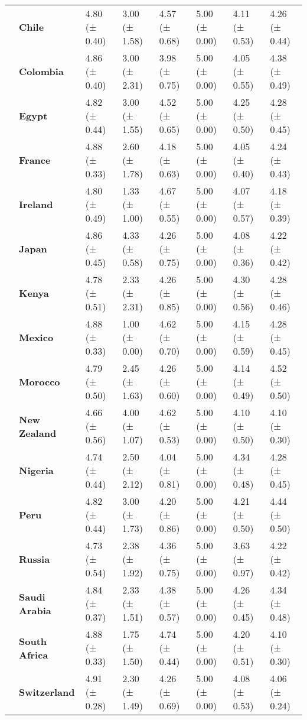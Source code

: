 \begin{longtable}{llllllll}
\textbf{} & \textbf{Chile} & 4.80 (± 0.40) & 3.00 (± 1.58) & 4.57 (± 0.68) & 5.00 (± 0.00) & 4.11 (± 0.53) & 4.26 (± 0.44) \\
\textbf{} & \textbf{Colombia} & 4.86 (± 0.40) & 3.00 (± 2.31) & 3.98 (± 0.75) & 5.00 (± 0.00) & 4.05 (± 0.55) & 4.38 (± 0.49) \\
\textbf{} & \textbf{Egypt} & 4.82 (± 0.44) & 3.00 (± 1.55) & 4.52 (± 0.65) & 5.00 (± 0.00) & 4.25 (± 0.50) & 4.28 (± 0.45) \\
\textbf{} & \textbf{France} & 4.88 (± 0.33) & 2.60 (± 1.78) & 4.18 (± 0.63) & 5.00 (± 0.00) & 4.05 (± 0.40) & 4.24 (± 0.43) \\
\textbf{} & \textbf{Ireland} & 4.80 (± 0.49) & 1.33 (± 1.00) & 4.67 (± 0.55) & 5.00 (± 0.00) & 4.07 (± 0.57) & 4.18 (± 0.39) \\
\textbf{} & \textbf{Japan} & 4.86 (± 0.45) & 4.33 (± 0.58) & 4.26 (± 0.75) & 5.00 (± 0.00) & 4.08 (± 0.36) & 4.22 (± 0.42) \\
\textbf{} & \textbf{Kenya} & 4.78 (± 0.51) & 2.33 (± 2.31) & 4.26 (± 0.85) & 5.00 (± 0.00) & 4.30 (± 0.56) & 4.28 (± 0.46) \\
\textbf{} & \textbf{Mexico} & 4.88 (± 0.33) & 1.00 (± 0.00) & 4.62 (± 0.70) & 5.00 (± 0.00) & 4.15 (± 0.59) & 4.28 (± 0.45) \\
\textbf{} & \textbf{Morocco} & 4.79 (± 0.50) & 2.45 (± 1.63) & 4.26 (± 0.60) & 5.00 (± 0.00) & 4.14 (± 0.49) & 4.52 (± 0.50) \\
\textbf{} & \textbf{New Zealand} & 4.66 (± 0.56) & 4.00 (± 1.07) & 4.62 (± 0.53) & 5.00 (± 0.00) & 4.10 (± 0.50) & 4.10 (± 0.30) \\
\textbf{} & \textbf{Nigeria} & 4.74 (± 0.44) & 2.50 (± 2.12) & 4.04 (± 0.81) & 5.00 (± 0.00) & 4.34 (± 0.48) & 4.28 (± 0.45) \\
\textbf{} & \textbf{Peru} & 4.82 (± 0.44) & 3.00 (± 1.73) & 4.20 (± 0.86) & 5.00 (± 0.00) & 4.21 (± 0.50) & 4.44 (± 0.50) \\
\textbf{} & \textbf{Russia} & 4.73 (± 0.54) & 2.38 (± 1.92) & 4.36 (± 0.75) & 5.00 (± 0.00) & 3.63 (± 0.97) & 4.22 (± 0.42) \\
\textbf{} & \textbf{Saudi Arabia} & 4.84 (± 0.37) & 2.33 (± 1.51) & 4.38 (± 0.57) & 5.00 (± 0.00) & 4.26 (± 0.45) & 4.34 (± 0.48) \\
\textbf{} & \textbf{South Africa} & 4.88 (± 0.33) & 1.75 (± 1.50) & 4.74 (± 0.44) & 5.00 (± 0.00) & 4.20 (± 0.51) & 4.10 (± 0.30) \\
\textbf{} & \textbf{Switzerland} & 4.91 (± 0.28) & 2.30 (± 1.49) & 4.26 (± 0.69) & 5.00 (± 0.00) & 4.08 (± 0.53) & 4.06 (± 0.24) \\

\end{longtable}
